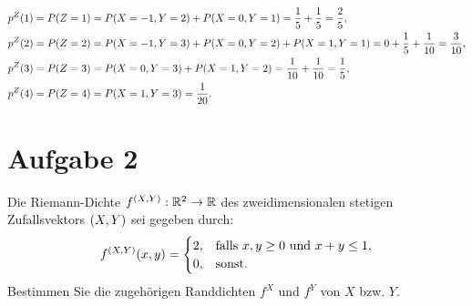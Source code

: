 \documentclass{exercise}
\begin{document}
\begin{enumerate}
\begin{align*}
            p^Z\parentheses*{1} &= P\parentheses*{Z = 1} = P\parentheses*{X = -1, Y = 2} + P\parentheses*{X = 0, Y = 1} = \frac{1}{5} + \frac{1}{5} = \frac{2}{5},\\
            p^Z\parentheses*{2} &= P\parentheses*{Z = 2} = P\parentheses*{X = -1, Y = 3} + P\parentheses*{X = 0, Y = 2} + P\parentheses*{X = 1, Y = 1} = 0 + \frac{1}{5} + \frac{1}{10} = \frac{3}{10},\\
            p^Z\parentheses*{3} &= P\parentheses*{Z = 3} = P\parentheses*{X = 0, Y = 3} + P\parentheses*{X = 1, Y = 2} = \frac{1}{10} + \frac{1}{10} = \frac{1}{5},\\
            p^Z\parentheses*{4} &= P\parentheses*{Z = 4} = P\parentheses*{X = 1, Y = 3} = \frac{1}{20}.
        \end{align*}
    \end{enumerate}
    
    
    \section*{Aufgabe 2}
    
    \begin{problem}
        Die Riemann-Dichte \(f^{\parentheses*{X, Y}}: \R^2 \to \R\) des zweidimensionalen stetigen Zufallsvektors \(\parentheses*{X, Y}\) sei gegeben durch:
        \[
            f^{\parentheses*{X, Y}}\parentheses*{x, y} = \begin{cases}
                2, & \text{falls }x, y \ge 0\text{ und }x + y \le 1,\\
                0, & \text{sonst}.
            \end{cases}
        \]
        Bestimmen Sie die zugehörigen Randdichten \(f^X\) und \(f^Y\) von \(X\) bzw. \(Y\).
    \end{problem}
    
\end{document}
